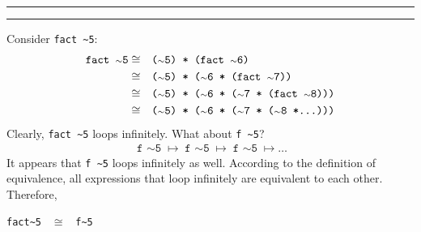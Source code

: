 \documentclass[11pt]{article}
\newcounter{questionCounter}
\newcounter{partCounter}[questionCounter]
\newenvironment{question}[2][\arabic{questionCounter}]{%
    \setcounter{partCounter}{0}%
    \vspace{.25in} \hrule \vspace{0.5em}%
        \noindent{\bf #2}%
    \vspace{0.8em} \hrule \vspace{.10in}%
    \addtocounter{questionCounter}{1}%
}{}
\begin{document}
\begin{question}{Task 3.2}
Consider \verb!fact ~5!:
\begin{align*}
    \texttt{fact $\scriptstyle\mathtt{\sim}$5} & \cong && \texttt{($\scriptstyle\mathtt{\sim}$5) * (fact $\scriptstyle\mathtt{\sim}$6)}\\
    & \cong && \texttt{($\scriptstyle\mathtt{\sim}$5) * ($\scriptstyle\mathtt{\sim}$6 * (fact $\scriptstyle\mathtt{\sim}$7))}\\
    & \cong && \texttt{($\scriptstyle\mathtt{\sim}$5) * ($\scriptstyle\mathtt{\sim}$6 * ($\scriptstyle\mathtt{\sim}$7 * (fact $\scriptstyle\mathtt{\sim}$8)))}\\
    & \cong && \texttt{($\scriptstyle\mathtt{\sim}$5) * ($\scriptstyle\mathtt{\sim}$6 * ($\scriptstyle\mathtt{\sim}$7 * ($\scriptstyle\mathtt{\sim}$8 *\dots)))}
\end{align*}
Clearly, \verb!fact ~5! loops infinitely. What about \verb!f ~5!?
\begin{align*}
    \texttt{f $\scriptstyle\mathtt{\sim}$5} \mapsto \texttt{f $\scriptstyle\mathtt{\sim}$5} \mapsto \texttt{f $\scriptstyle\mathtt{\sim}$5} \mapsto \dots
\end{align*}
It appears that \verb!f ~5! loops infinitely as well. According to the definition of equivalence, all expressions that loop infinitely are equivalent to each other. Therefore,

\begin{center}
\verb!fact~5 ! $\cong$ \verb! f~5!
\end{center}
\end{question}

\newpage
\end{document}
